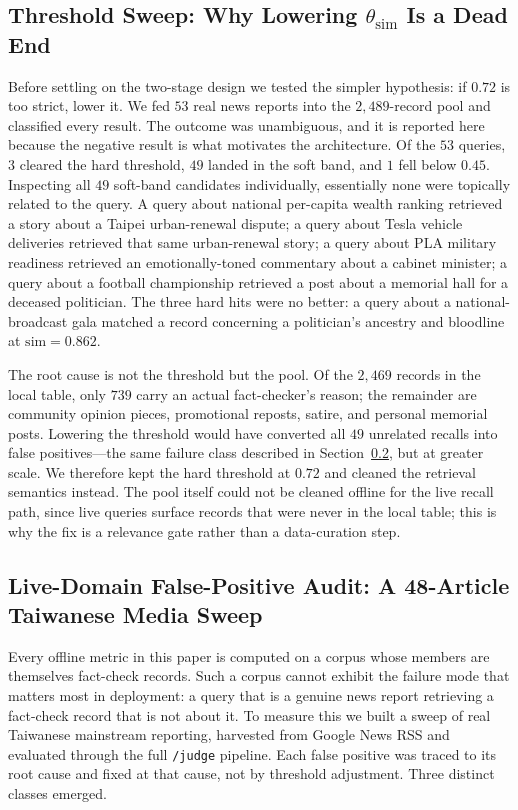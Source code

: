\documentclass[twoside]{llncs}
\begin{document}
\subsection{Threshold Sweep: Why Lowering $\theta_{\text{sim}}$ Is a Dead End}
\label{sec:threshold-sweep}
Before settling on the two-stage design we tested the simpler hypothesis: if $0.72$ is too strict, lower it. We fed $53$ real news reports into the $2{,}489$-record pool and classified every result. The outcome was unambiguous, and it is reported here because the negative result is what motivates the architecture. Of the $53$ queries, $3$ cleared the hard threshold, $49$ landed in the soft band, and $1$ fell below $0.45$. Inspecting all $49$ soft-band candidates individually, essentially none were topically related to the query. A query about national per-capita wealth ranking retrieved a story about a Taipei urban-renewal dispute; a query about Tesla vehicle deliveries retrieved that same urban-renewal story; a query about PLA military readiness retrieved an emotionally-toned commentary about a cabinet minister; a query about a football championship retrieved a post about a memorial hall for a deceased politician. The three hard hits were no better: a query about a national-broadcast gala matched a record concerning a politician's ancestry and bloodline at $\text{sim} = 0.862$.

The root cause is not the threshold but the pool. Of the $2{,}469$ records in the local table, only $739$ carry an actual fact-checker's reason; the remainder are community opinion pieces, promotional reposts, satire, and personal memorial posts. Lowering the threshold would have converted all $49$ unrelated recalls into false positives---the same failure class described in Section~\ref{sec:audit}, but at greater scale. We therefore kept the hard threshold at $0.72$ and cleaned the retrieval semantics instead. The pool itself could not be cleaned offline for the live recall path, since live queries surface records that were never in the local table; this is why the fix is a relevance gate rather than a data-curation step.

\subsection{Live-Domain False-Positive Audit: A 48-Article Taiwanese Media Sweep}
\label{sec:audit}
Every offline metric in this paper is computed on a corpus whose members are themselves fact-check records. Such a corpus cannot exhibit the failure mode that matters most in deployment: a query that is a genuine news report retrieving a fact-check record that is not about it. To measure this we built a sweep of real Taiwanese mainstream reporting, harvested from Google News RSS and evaluated through the full \texttt{/judge} pipeline. Each false positive was traced to its root cause and fixed at that cause, not by threshold adjustment. Three distinct classes emerged.
\end{document}
